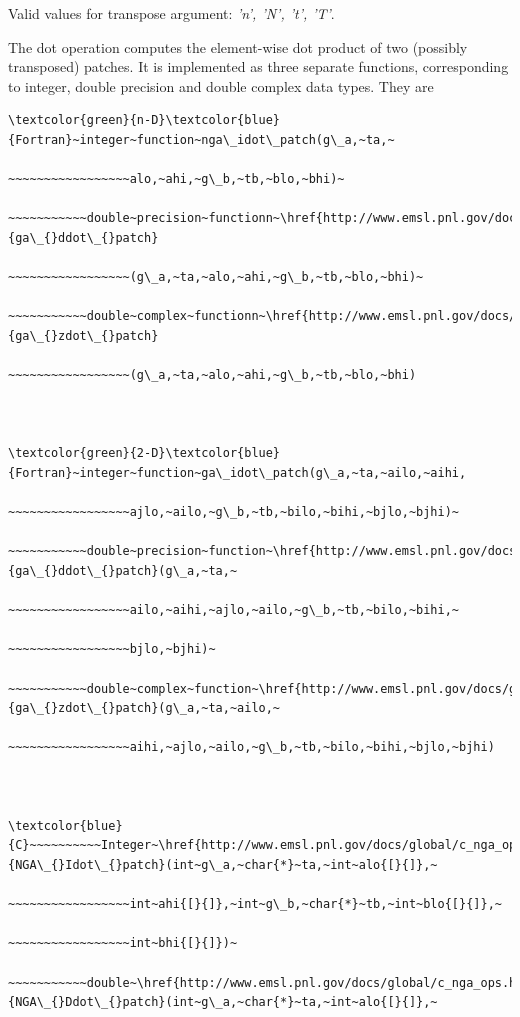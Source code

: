 Valid values for transpose argument:\emph{ 'n', 'N', 't', 'T'}.

The dot operation computes the element-wise dot product of two (possibly
transposed) patches. It is implemented as three separate functions,
corresponding to integer, double precision and double complex data
types. They are
\begin{verbatim}
\textcolor{green}{n-D}\textcolor{blue}{Fortran}~integer~function~nga\_idot\_patch(g\_a,~ta,~

~~~~~~~~~~~~~~~~~alo,~ahi,~g\_b,~tb,~blo,~bhi)~

~~~~~~~~~~~double~precision~functionn~\href{http://www.emsl.pnl.gov/docs/global/ga_ops.html\#ga_ddot_patch}{ga\_{}ddot\_{}patch}

~~~~~~~~~~~~~~~~~(g\_a,~ta,~alo,~ahi,~g\_b,~tb,~blo,~bhi)~

~~~~~~~~~~~double~complex~functionn~\href{http://www.emsl.pnl.gov/docs/global/ga_ops.html\#ga_zdot_patch}{ga\_{}zdot\_{}patch}

~~~~~~~~~~~~~~~~~(g\_a,~ta,~alo,~ahi,~g\_b,~tb,~blo,~bhi)



\textcolor{green}{2-D}\textcolor{blue}{Fortran}~integer~function~ga\_idot\_patch(g\_a,~ta,~ailo,~aihi,

~~~~~~~~~~~~~~~~~ajlo,~ailo,~g\_b,~tb,~bilo,~bihi,~bjlo,~bjhi)~

~~~~~~~~~~~double~precision~function~\href{http://www.emsl.pnl.gov/docs/global/ga_ops.html\#ga_ddot_patch}{ga\_{}ddot\_{}patch}(g\_a,~ta,~

~~~~~~~~~~~~~~~~~ailo,~aihi,~ajlo,~ailo,~g\_b,~tb,~bilo,~bihi,~

~~~~~~~~~~~~~~~~~bjlo,~bjhi)~

~~~~~~~~~~~double~complex~function~\href{http://www.emsl.pnl.gov/docs/global/ga_ops.html\#ga_zdot_patch}{ga\_{}zdot\_{}patch}(g\_a,~ta,~ailo,~

~~~~~~~~~~~~~~~~~aihi,~ajlo,~ailo,~g\_b,~tb,~bilo,~bihi,~bjlo,~bjhi)



\textcolor{blue}{C}~~~~~~~~~~Integer~\href{http://www.emsl.pnl.gov/docs/global/c_nga_ops.html\#ga_dot_patch}{NGA\_{}Idot\_{}patch}(int~g\_a,~char{*}~ta,~int~alo{[}{]},~

~~~~~~~~~~~~~~~~~int~ahi{[}{]},~int~g\_b,~char{*}~tb,~int~blo{[}{]},~

~~~~~~~~~~~~~~~~~int~bhi{[}{]})~

~~~~~~~~~~~double~\href{http://www.emsl.pnl.gov/docs/global/c_nga_ops.html\#ga_dot_patch}{NGA\_{}Ddot\_{}patch}(int~g\_a,~char{*}~ta,~int~alo{[}{]},~


\end{verbatim}
